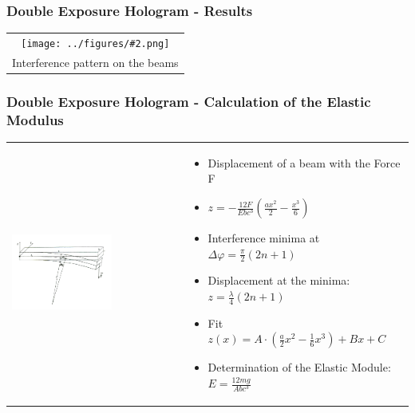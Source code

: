 \documentclass[10pt]{beamer}
\newcommand{\gra}[3][]{
	\begin{table}
	\centering
	\begin{tabular}[width=\textwidth]{c}
		\texttt{[image: ../figures/\#2.png]}\\
		\small #3
	\end{tabular}
	\end{table}
}
\newcommand{\graThree}[6][0.49]{
	\begin{tabular}[width=\textwidth]{ccc}
		\texttt{[image: ../figures/\#2.png]}&
		\texttt{[image: ../figures/\#3.png]}&
		\texttt{[image: ../figures/\#4.png]}&
		\captionof{figure}[#5]{#6}
	\end{tabular}
}
\begin{document}
\begin{frame}
	\frametitle{Double Exposure Hologram - Results}
	\gra[0.8]{staebe4}{Interference pattern on the beams}
\end{frame}

\begin{frame}
	\frametitle{Double Exposure Hologram - Calculation of the Elastic Modulus}
	\begin{table}
		\centering
		\begin{tabular}[width=\textwidth]{m{6cm}m{4cm}}
			\includegraphics[width=0.6\textwidth]{../figures/balken_biegen.png}&
			\begin{itemize}
				\item Displacement of a beam with the Force F
				\item $z=-\frac{12F}{Ebc^3}\left(\frac{ax^2}{2}-\frac{x^3}{6} \right)$
				\item Interference minima at $\Delta \varphi=\frac{\pi}{2}(2n+1)$
				\item Displacement at the minima: $z=\frac{\lambda}{4}(2n+1)$
				\item Fit $z(x)=A\cdot\left(\frac a2x^2-\frac{1}{6}x^3\right)+Bx+C$
				\item Determination of the Elastic Module: $E=\frac{12mg}{Abc^3}$
			\end{itemize}
		\end{tabular}
	\end{table}
\end{frame}
\end{document}

